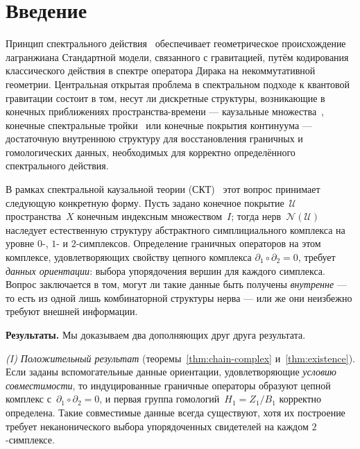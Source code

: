 \documentclass[11pt,a4paper]{article}
\theoremstyle{plain}
\theoremstyle{definition}
\theoremstyle{remark}
\newcommand{\cU}{\mathcal{U}}
\newcommand{\cN}{\mathcal{N}}
\begin{document}
\section{Введение}
\label{sec:intro}

Принцип спектрального действия~\cite{Chamseddine:1996zu,Chamseddine:2006ep}
обеспечивает геометрическое происхождение лагранжиана Стандартной модели,
связанного с гравитацией, путём кодирования классического действия в
спектре оператора Дирака на некоммутативной геометрии. Центральная открытая
проблема в спектральном подходе к квантовой гравитации состоит в том,
несут ли дискретные структуры, возникающие в конечных приближениях
пространства-времени --- каузальные множества~\cite{Bombelli:1987aa,
Sorkin:2003bx}, конечные спектральные тройки~\cite{Connes:1994yd,
vanSuijlekom:2014pya} или конечные покрытия континуума --- достаточную
внутреннюю структуру для восстановления граничных и гомологических данных,
необходимых для корректно определённого спектрального действия.

В рамках спектральной каузальной теории
(СКТ)~\cite{Alfyorov:2026ff,Alfyorov:2026ss,Alfyorov:2026ct}
этот вопрос принимает следующую конкретную форму.
Пусть задано конечное покрытие~$\cU$ пространства~$X$ конечным
индексным множеством~$I$; тогда нерв~$\cN(\cU)$ наследует естественную
структуру абстрактного симплициального комплекса на уровне $0$-, $1$-
и $2$-симплексов. Определение граничных операторов на этом комплексе,
удовлетворяющих свойству цепного комплекса
$\partial_1 \circ \partial_2 = 0$, требует \emph{данных ориентации}:
выбора упорядочения вершин для каждого симплекса. Вопрос заключается в том,
могут ли такие данные быть получены \emph{внутренне} --- то есть
из одной лишь комбинаторной структуры нерва --- или же они неизбежно
требуют внешней информации.

\medskip

\noindent\textbf{Результаты.} Мы доказываем два дополняющих друг друга
результата.

\smallskip
\noindent\emph{(I) Положительный результат} (теоремы~\ref{thm:chain-complex}
и~\ref{thm:existence}). Если заданы вспомогательные данные ориентации,
удовлетворяющие \emph{условию совместимости}, то индуцированные
граничные операторы образуют цепной комплекс с~$\partial_1 \circ \partial_2 = 0$,
и первая группа гомологий~$H_1 = Z_1 / B_1$ корректно определена.
Такие совместимые данные всегда существуют, хотя их построение требует
неканонического выбора упорядоченных свидетелей на каждом $2$-симплексе.
\end{document}
